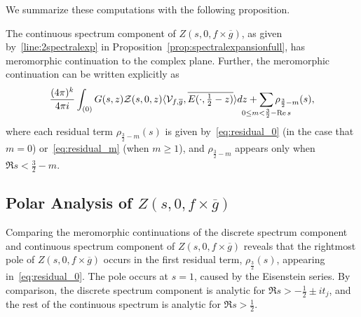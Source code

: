 We summarize these computations with the following proposition.
\begin{proposition}
  The continuous spectrum component of $Z(s, 0, f\times \overline{g})$, as given
  by~\eqref{line:2spectralexp} in Proposition~\ref{prop:spectralexpansionfull}, has
  meromorphic continuation to the complex plane.
  Further, the meromorphic continuation can be written explicitly as
  \begin{equation}
    \frac{(4\pi)^k}{4\pi i} \int_{(0)} G(s,z) \mathcal{Z}(s,0,z) \langle \mathcal{V}_{f,
    \overline{g}}, \overline{E(\cdot, \tfrac{1}{2} - z)}\rangle dz + \sum_{\mathclap{0
    \leq m < \frac{3}{2} - \Re s}} \rho_{\frac{3}{2} - m}(s),
  \end{equation}
  where each residual term $\rho_{\frac{3}{2} - m}(s)$ is given by~\eqref{eq:residual_0}
  (in the case that $m = 0$) or~\eqref{eq:residual_m} (when $m \geq 1$), and
  $\rho_{\frac{3}{2} - m}$ appears only when $\Re s < \tfrac{3}{2} - m$.
\end{proposition}



\subsection{Polar Analysis of $Z(s, 0, f\times \overline{g})$}


Comparing the meromorphic continuations of the discrete spectrum component and continuous
spectrum component of $Z(s, 0, f\times \overline{g})$ reveals that the rightmost pole of
$Z(s, 0, f\times \overline{g})$ occurs in the first residual term,
$\rho_{\frac{3}{2}}(s)$, appearing in~\eqref{eq:residual_0}.
The pole occurs at $s = 1$, caused by the Eisenstein series.
By comparison, the discrete spectrum component is analytic for $\Re s > -\tfrac{1}{2} \pm
it_j$, and the rest of the continuous spectrum is analytic for $\Re s > \tfrac{1}{2}$.


